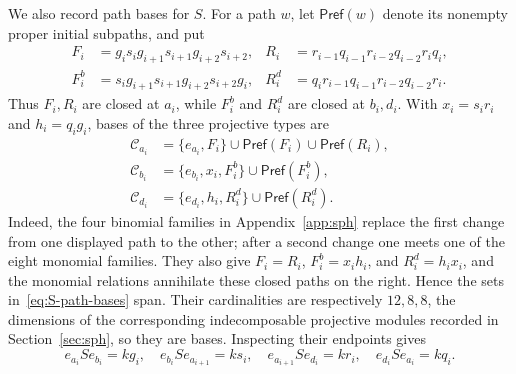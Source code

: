 \documentclass[11pt]{amsart}
\theoremstyle{plain}
\theoremstyle{definition}
\begin{document}
We also record path bases for $S$. For a path $w$, let $\mathsf{Pref}(w)$ denote its nonempty proper initial
subpaths, and put
\[
\begin{aligned}
 F_i&=g_is_ig_{i+1}s_{i+1}g_{i+2}s_{i+2},
 &R_i&=r_{i-1}q_{i-1}r_{i-2}q_{i-2}r_iq_i,\\
 F_i^b&=s_ig_{i+1}s_{i+1}g_{i+2}s_{i+2}g_i,
 &R_i^d&=q_ir_{i-1}q_{i-1}r_{i-2}q_{i-2}r_i.
\end{aligned}
\]
Thus $F_i,R_i$ are closed at $a_i$, while $F_i^b$ and $R_i^d$ are closed at $b_i,d_i$. With $x_i=s_ir_i$ and
$h_i=q_ig_i$, bases of the three projective types are
\begin{equation}\label{eq:S-path-bases}
\begin{aligned}
 \mathcal C_{a_i}&=\{e_{a_i},F_i\}\cup\mathsf{Pref}(F_i)\cup\mathsf{Pref}(R_i),\\
 \mathcal C_{b_i}&=\{e_{b_i},x_i,F_i^b\}\cup\mathsf{Pref}(F_i^b),\\
 \mathcal C_{d_i}&=\{e_{d_i},h_i,R_i^d\}\cup\mathsf{Pref}(R_i^d).
\end{aligned}
\end{equation}
Indeed, the four binomial families in Appendix~\ref{app:sph} replace the first change from one displayed path
to the other; after a second change one meets one of the eight monomial families. They also give $F_i=R_i$,
$F_i^b=x_ih_i$, and $R_i^d=h_ix_i$, and the monomial relations annihilate these closed paths on the right.
Hence the sets in~\eqref{eq:S-path-bases} span. Their cardinalities are respectively $12,8,8$, the dimensions
of the corresponding indecomposable projective modules recorded in Section~\ref{sec:sph}, so they are bases.
Inspecting their endpoints gives
\begin{equation}\label{eq:S-arrow-corners}
 e_{a_i}Se_{b_i}=kg_i,\quad e_{b_i}Se_{a_{i+1}}=ks_i,\quad
 e_{a_{i+1}}Se_{d_i}=kr_i,\quad e_{d_i}Se_{a_i}=kq_i.
\end{equation}
\end{document}
